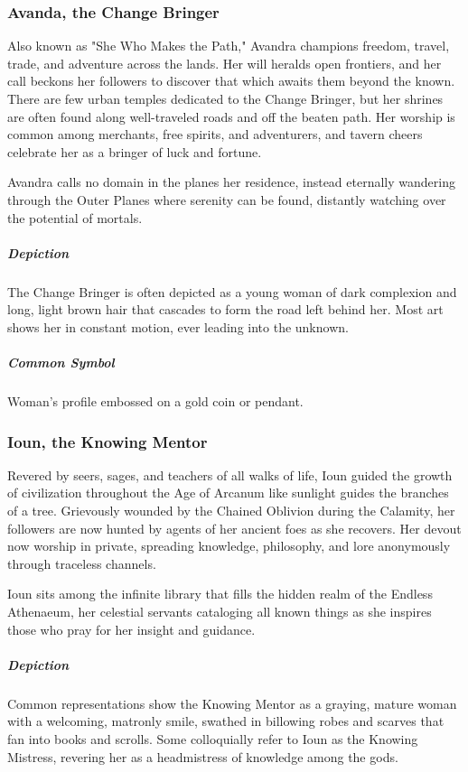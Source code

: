 \documentclass[letterpaper, twocolumn, openany, nodeprecatedcode, layout=true]{dndbook}
\begin{document}
\subsubsection{Avanda, the Change Bringer}

Also known as "She Who Makes the Path," Avandra champions freedom, travel, trade, and
adventure across the lands. Her will heralds open frontiers, and her call beckons her
followers to discover that which awaits them beyond the known. There are few urban temples
dedicated to the Change Bringer, but her shrines are often found along well-traveled roads
and off the beaten path. Her worship is common among merchants, free spirits, and adventurers,
and tavern cheers celebrate her as a bringer of luck and fortune.

Avandra calls no domain in the planes her residence, instead eternally wandering through the
Outer Planes where serenity can be found, distantly watching over the potential of mortals.

\subparagraph{Depiction}
The Change Bringer is often depicted as a young woman of dark complexion and long, light brown
hair that cascades to form the road left behind her. Most art shows her in constant motion,
ever leading into the unknown.

\subparagraph{Common Symbol}
Woman’s profile embossed on a gold coin or pendant.

\subsubsection{Ioun, the Knowing Mentor}

Revered by seers, sages, and teachers of all walks of life, Ioun guided the growth of
civilization throughout the Age of Arcanum like sunlight guides the branches of a tree.
Grievously wounded by the Chained Oblivion during the Calamity, her followers are now
hunted by agents of her ancient foes as she recovers. Her devout now worship in private,
spreading knowledge, philosophy, and lore anonymously through traceless channels.

Ioun sits among the infinite library that fills the hidden realm of the Endless Athenaeum,
her celestial servants cataloging all known things as she inspires those who pray for
her insight and guidance.

\subparagraph{Depiction}
Common representations show the Knowing Mentor as a graying, mature woman with a welcoming,
matronly smile, swathed in billowing robes and scarves that fan into books and scrolls.
Some colloquially refer to Ioun as the Knowing Mistress, revering her as a headmistress
of knowledge among the gods.
\end{document}
